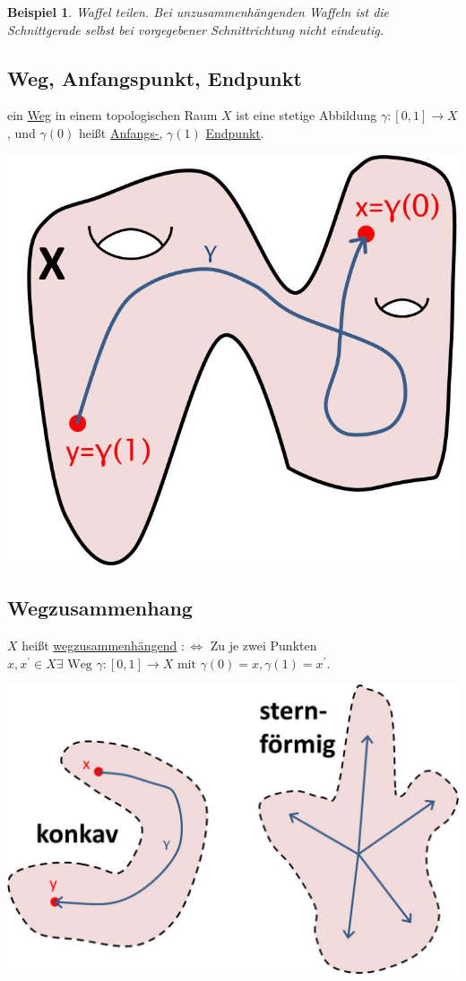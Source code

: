 \documentclass[a4paper,11pt,notitlepage]{report}
\newtheorem{example}{Beispiel}[chapter]
\newenvironment{Kasten}[1]
{
\hspace{0.05\linewidth}
\begin{center}
\begin{minipage}{0.9\linewidth}
\setlength{\fboxsep}{10pt}
\definecolor{shadecolor}{gray}{1}
\definecolor{framecolor}{gray}{0}
\def\FrameCommand{\fcolorbox{framecolor}{shadecolor}}
\MakeFramed {\FrameRestore}
\subsection{#1}
\begin{itshape}
}
{
\end{itshape}
\endMakeFramed
\end{minipage}
\end{center}
}
\begin{document}
\begin{example}{Waffel teilen.}
\newline
Bei unzusammenhängenden Waffeln ist die Schnittgerade selbst bei vorgegebener Schnittrichtung nicht eindeutig.
\end{example}

\begin{Kasten}{Weg, Anfangspunkt, Endpunkt}
	ein \underline{Weg} in einem topologischen Raum $X$ ist eine stetige Abbildung $\gamma \colon [0,1] \rightarrow X$, und $\gamma(0)$ heißt \underline{Anfangs-}, $\gamma(1)$ \underline{Endpunkt}.
	\newline
\end{Kasten}
\includegraphics[scale=0.4]{images/Weg.jpg}

\begin{Kasten}{Wegzusammenhang}
	$X$ heißt \underline{wegzusammenhängend} $:\Leftrightarrow$ Zu je zwei Punkten $x,x^\prime \in X \exists \text{ Weg } \gamma \colon [0,1] \rightarrow X \text{ mit } \gamma(0)=x, \gamma(1)=x^\prime$.
	\newline
\end{Kasten}
\includegraphics[scale=0.4]{images/Wegzshgd.jpg}
\end{document}
